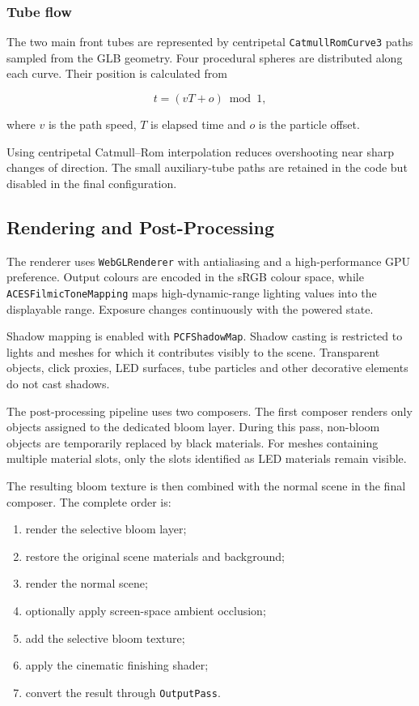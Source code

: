 \documentclass{report}
\begin{document}
\subsubsection{Tube flow}

The two main front tubes are represented by centripetal
\texttt{CatmullRomCurve3} paths sampled from the GLB geometry. Four
procedural spheres are distributed along each curve. Their position is
calculated from

\[
t = (vT + o) \bmod 1,
\]

where \(v\) is the path speed, \(T\) is elapsed time and \(o\) is the
particle offset.

Using centripetal Catmull--Rom interpolation reduces overshooting near
sharp changes of direction. The small auxiliary-tube paths are retained
in the code but disabled in the final configuration.

\subsection{Rendering and Post-Processing}

The renderer uses \texttt{WebGLRenderer} with antialiasing and a
high-performance GPU preference. Output colours are encoded in the sRGB
colour space, while \texttt{ACESFilmicToneMapping} maps high-dynamic-range
lighting values into the displayable range. Exposure changes continuously
with the powered state.

Shadow mapping is enabled with \texttt{PCFShadowMap}. Shadow casting is
restricted to lights and meshes for which it contributes visibly to the
scene. Transparent objects, click proxies, LED surfaces, tube particles
and other decorative elements do not cast shadows.

The post-processing pipeline uses two composers. The first composer
renders only objects assigned to the dedicated bloom layer. During this
pass, non-bloom objects are temporarily replaced by black materials.
For meshes containing multiple material slots, only the slots identified
as LED materials remain visible.

The resulting bloom texture is then combined with the normal scene in
the final composer. The complete order is:

\begin{enumerate}
    \item render the selective bloom layer;
    \item restore the original scene materials and background;
    \item render the normal scene;
    \item optionally apply screen-space ambient occlusion;
    \item add the selective bloom texture;
    \item apply the cinematic finishing shader;
    \item convert the result through \texttt{OutputPass}.
\end{enumerate}
\end{document}

